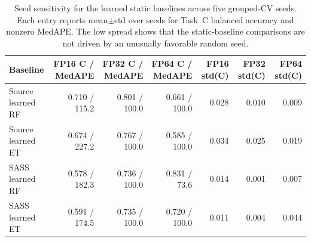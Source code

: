 \begin{table}[t]
  \centering
  \caption{Seed sensitivity for the learned static baselines across five grouped-CV seeds. Each entry reports mean$\pm$std over seeds for Task~C balanced accuracy and nonzero MedAPE. The low spread shows that the static-baseline comparisons are not driven by an unusually favorable random seed.}
  \label{tab:seed-sensitivity}
  \scriptsize
  \setlength{\tabcolsep}{4pt}
  \begin{tabular}{lrrrrrr}
    \toprule
    Baseline & FP16 C / MedAPE & FP32 C / MedAPE & FP64 C / MedAPE & FP16 std(C) & FP32 std(C) & FP64 std(C) \\
    \midrule
    Source learned RF & 0.710 / 115.2 & 0.801 / 100.0 & 0.661 / 100.0 & 0.028 & 0.010 & 0.009 \\
    Source learned ET & 0.674 / 227.2 & 0.767 / 100.0 & 0.585 / 100.0 & 0.034 & 0.025 & 0.019 \\
    SASS learned RF & 0.578 / 182.3 & 0.736 / 100.0 & 0.831 / 73.6 & 0.014 & 0.001 & 0.007 \\
    SASS learned ET & 0.591 / 174.5 & 0.735 / 100.0 & 0.720 / 100.0 & 0.011 & 0.004 & 0.044 \\
    \bottomrule
  \end{tabular}
\end{table}
